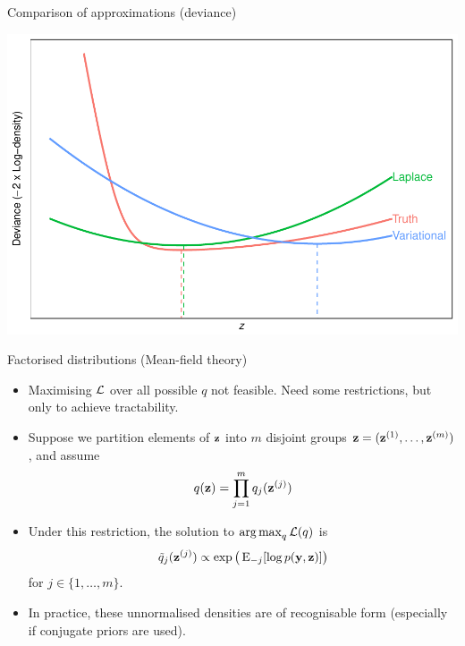 \begin{frame}{Comparison of approximations (deviance)}
  \vspace{-5pt}
  \begin{center}
    \includegraphics[scale=0.7]{figure/compare6}
  \end{center}
\end{frame}

\begin{frame}{Factorised distributions (Mean-field theory)}
  \vspace{-20pt}
  \begin{itemize}
    \item Maximising ${\mathcal L}$ over all possible $q$ not feasible. Need some restrictions, but only to achieve tractability.
    \item Suppose we partition elements of ${\mathbf z}$ into $m$ disjoint groups ${\mathbf z} = ({\mathbf z}^{(1)}, \dots, {\mathbf z}^{(m)})$, and assume
    \[
      q({\mathbf z}) = \prod_{j=1}^m q_j({\mathbf z}^{(j)})
    \]
    \item Under this restriction, the solution to $\operatorname*{arg\,max}_q {\mathcal L}(q)$ is
    \begin{align}\label{eq:meanfieldsoln}
      \tilde q_j({\mathbf z}^{(j)}) \propto \exp\big(\operatorname{E}_{-j}[\log p({\mathbf y},{\mathbf z})]\big)
    \end{align}
    for $j \in \{1,\dots,m\}$.
    \item In practice, these unnormalised densities are of recognisable form (especially if conjugate priors are used).
    \vspace{4pt}
  \end{itemize}
\end{frame}


